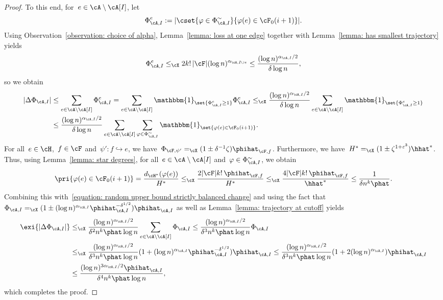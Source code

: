 \documentclass[11pt]{amsart}
\newcommand{\eps}{\varepsilon}
\DeclarePairedDelimiter{\abs}{\lvert}{\rvert}
\newcommand{\ind}{\mathbbm{1}}
\newcommand{\Xleq}{\leq_{\cX}}
\newcommand{\Xeq}{=_{\cX}}
\def\phi{\varphi}
\newcommand{\injection}{\hookrightarrow}
\theoremstyle{definition}
\numberwithin{equation}{section}
\begin{document}
\begin{proof}
		To this end, for~$e\in\cA\setminus\cA[I]$, let
		\begin{equation*}
			\Phi^e_{\cA,I}:=\abs{\cset{ \phi\in\Phi_{\cA,I}^\sim }{ \phi(e)\in \cF_0(i+1) }}.
		\end{equation*}
		Using Observation~\ref{observation: choice of alpha}, Lemma~\ref{lemma: loss at one edge} together with Lemma~\ref{lemma: has smallest trajectory} yields
		\begin{equation*}
			\Phi^e_{\cA,I}
			\Xleq 2k!\,\abs{\cF}(\log n)^{\alpha_{\cA,I\cup e}}
			\leq \frac{(\log n)^{\alpha_{\cA,I}/2}}{\delta\log n},
		\end{equation*}
		so we obtain
		\begin{equation}\label{equation: random upper bound strictly balanced change}
			\begin{aligned}
				\abs{\Delta\Phi_{\cA,I}}
				&\leq \sum_{e\in\cA\setminus\cA[I]} \Phi_{\cA,I}^e
				=\sum_{e\in\cA\setminus\cA[I]} \ind_{\set{\Phi_{\cA,I}^e\geq 1}}\Phi_{\cA,I}^e
				\Xleq \frac{(\log n)^{\alpha_{\cA,I}/2}}{\delta\log n}\sum_{e\in\cA\setminus\cA[I]}\ind_{\set{\Phi_{\cA,I}^e\geq 1}}\\
				&\leq \frac{(\log n)^{\alpha_{\cA,I}/2}}{\delta\log n}\sum_{e\in\cA\setminus\cA[I]}\sum_{\phi\in\Phi_{\cA,I}^\sim}\ind_{\set{\phi(e)\in\cF_0(i+1)}}.
			\end{aligned}
		\end{equation}
		For all~$e\in\cH$,~$f\in\cF$ and~$\psi'\colon f\injection e$, we have~$\Phi_{\cF,\psi'}\Xeq (1\pm\delta^{-1}\zeta)\phihat_{\cF,f}$.
		Furthermore, we have~$H^*\Xeq (1\pm\zeta^{1+\eps^3})\hhat^*$.
		Thus, using Lemma~\ref{lemma: star degrees}, for all~$e\in\cA\setminus\cA[I]$ and~$\varphi\in\Phi_{\cA,I}^\sim$, we obtain
		\begin{equation*}
			\pri{ \phi(e)\in\cF_0(i+1) }
			=\frac{d_{\cH^*}(\phi(e))}{H^*}
			\Xleq \frac{2\abs{\cF}k!\, \phihat_{\cF,f}}{H^*}
			\Xleq \frac{4\abs{\cF}k!\,\phihat_{\cF,f}}{\hhat^*}
			\leq \frac{1}{\delta n^k\phat}.
		\end{equation*}
		Combining this with~\eqref{equation: random upper bound strictly balanced change} and using the fact that~$\Phi_{\cA,I}\Xeq (1\pm (\log n)^{\alpha_{\cA,I}}\phihat_{\cA,I}^{-\delta^{1/2}})\phihat_{\cA,I}$ as well as Lemma~\ref{lemma: trajectory at cutoff} yields
		\begin{equation*}
			\begin{aligned}
				\exi{\abs{\Delta \Phi_{\cA,I}}}
				&\Xleq \frac{(\log n)^{\alpha_{\cA,I}/2}}{\delta^2n^k\phat \log n}\sum_{e\in\cA\setminus\cA[I]} \Phi_{\cA,I}
				\leq \frac{(\log n)^{\alpha_{\cA,I}/2}}{\delta^3n^k\phat \log n}\Phi_{\cA,I}\\
				&\Xleq \frac{(\log n)^{\alpha_{\cA,I}/2}}{\delta^3n^k\phat \log n}(1+ (\log n)^{\alpha_{\cA,I}}\phihat_{\cA,I}^{-\delta^{1/2}})\phihat_{\cA,I}
				\leq \frac{(\log n)^{\alpha_{\cA,I}/2}}{\delta^3n^k\phat \log n}(1+ 2(\log n)^{\alpha_{\cA,I}})\phihat_{\cA,I}\\
				&\leq \frac{(\log n)^{3\alpha_{\cA,I}/2}\phihat_{\cA,I}}{\delta^4  n^k\phat\log n},
			\end{aligned}
		\end{equation*}
		which completes the proof.
	\end{proof}
	
\end{document}
